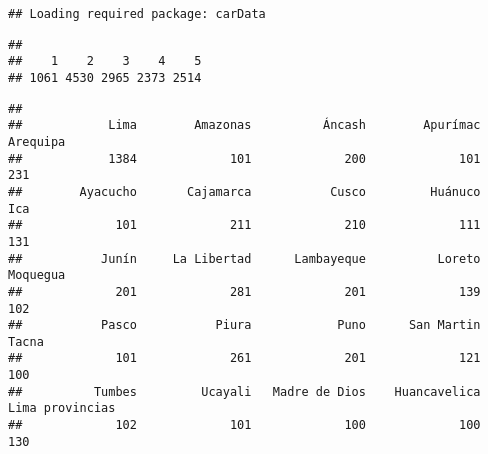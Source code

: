 \documentclass[
]{article}
\newenvironment{Shaded}{\begin{snugshade}}{\end{snugshade}}
\newcommand{\CommentTok}[1]{\textcolor[rgb]{0.56,0.35,0.01}{\textit{#1}}}
\newcommand{\FunctionTok}[1]{\textcolor[rgb]{0.13,0.29,0.53}{\textbf{#1}}}
\newcommand{\NormalTok}[1]{#1}
\newcommand{\OtherTok}[1]{\textcolor[rgb]{0.56,0.35,0.01}{#1}}
\newcommand{\SpecialCharTok}[1]{\textcolor[rgb]{0.81,0.36,0.00}{\textbf{#1}}}
\newcommand{\StringTok}[1]{\textcolor[rgb]{0.31,0.60,0.02}{#1}}
\begin{document}
\begin{verbatim}
## Loading required package: carData
\end{verbatim}

\begin{Shaded}
\end{Shaded}

\begin{verbatim}
## 
##    1    2    3    4    5 
## 1061 4530 2965 2373 2514
\end{verbatim}

\begin{Shaded}
\end{Shaded}

\begin{verbatim}
## 
##            Lima        Amazonas          Áncash        Apurímac        Arequipa 
##            1384             101             200             101             231 
##        Ayacucho       Cajamarca           Cusco         Huánuco             Ica 
##             101             211             210             111             131 
##           Junín     La Libertad      Lambayeque          Loreto        Moquegua 
##             201             281             201             139             102 
##           Pasco           Piura            Puno      San Martin           Tacna 
##             101             261             201             121             100 
##          Tumbes         Ucayali   Madre de Dios    Huancavelica Lima provincias 
##             102             101             100             100             130
\end{verbatim}
\end{document}

